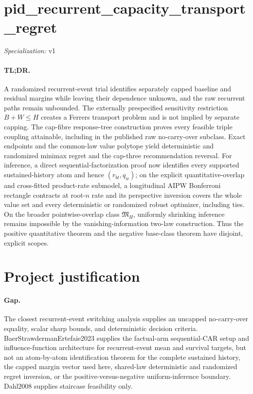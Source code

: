 \documentclass{article}
\begin{document}
\sloppy

\section*{pid\_\allowbreak{}recurrent\_\allowbreak{}capacity\_\allowbreak{}transport\_\allowbreak{}regret}

\noindent\textit{Specialization:} v1\par

\paragraph{TL;DR.} A randomized recurrent-event trial identifies separately capped baseline and residual margins while leaving their dependence unknown, and the raw recurrent paths remain unbounded. The externally prespecified sensitivity restriction \(B+W\le H\) creates a Ferrers transport problem and is not implied by separate capping. The cap-fibre response-tree construction proves every feasible triple coupling attainable, including in the published raw no-carry-over subclass. Exact endpoints and the common-law value polytope yield deterministic and randomized minimax regret and the cap-three recommendation reversal. For inference, a direct sequential-factorization proof now identifies every supported sustained-history atom and hence \((r_{bt},q_w)\); on the explicit quantitative-overlap and cross-fitted product-rate submodel, a longitudinal AIPW Bonferroni rectangle contracts at root-\(n\) rate and its perspective inversion covers the whole value set and every deterministic or randomized robust optimizer, including ties. On the broader pointwise-overlap class \(\mathfrak M_H\), uniformly shrinking inference remains impossible by the vanishing-information two-law construction. Thus the positive quantitative theorem and the negative base-class theorem have disjoint, explicit scopes.

\section{Project justification}

\paragraph{Gap.} The closest recurrent-event switching analysis supplies an uncapped no-carry-over equality, scalar sharp bounds, and deterministic decision criteria. BaerStrawdermanErtefaie2023 supplies the factual-arm sequential-CAR setup and influence-function architecture for recurrent-event mean and survival targets, but not an atom-by-atom identification theorem for the complete sustained history, the capped margin vector used here, shared-law deterministic and randomized regret inversion, or the positive-versus-negative uniform-inference boundary. Dahl2008 supplies staircase feasibility only.
\end{document}
